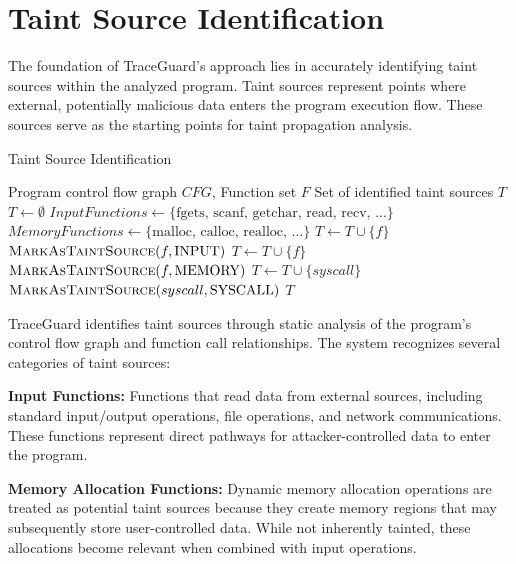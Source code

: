 \section{Taint Source Identification}

The foundation of TraceGuard's approach lies in accurately identifying taint sources within the analyzed program. Taint sources represent points where external, potentially malicious data enters the program execution flow. These sources serve as the starting points for taint propagation analysis.

\begin{algorithm}
\caption{Taint Source Identification}
\begin{algorithmic}[1]
\Require Program control flow graph $CFG$, Function set $F$
\Ensure Set of identified taint sources $T$
\State $T \gets \emptyset$
\State $InputFunctions \gets \{\text{fgets, scanf, getchar, read, recv, ...}\}$
\State $MemoryFunctions \gets \{\text{malloc, calloc, realloc, ...}\}$
        \State $T \gets T \cup \{f\}$
        \State $\textsc{MarkAsTaintSource}(f, \text{INPUT})$
        \State $T \gets T \cup \{f\}$
        \State $\textsc{MarkAsTaintSource}(f, \text{MEMORY})$
    \EndIf
\EndFor
{}
        \State $T \gets T \cup \{syscall\}$
        \State $\textsc{MarkAsTaintSource}(syscall, \text{SYSCALL})$
    \EndIf
\EndFor
\State \Return $T$
\end{algorithmic}
\end{algorithm}

TraceGuard identifies taint sources through static analysis of the program's control flow graph and function call relationships. The system recognizes several categories of taint sources:

\textbf{Input Functions:} Functions that read data from external sources, including standard input/output operations, file operations, and network communications. These functions represent direct pathways for attacker-controlled data to enter the program.

\textbf{Memory Allocation Functions:} Dynamic memory allocation operations are treated as potential taint sources because they create memory regions that may subsequently store user-controlled data. While not inherently tainted, these allocations become relevant when combined with input operations.

